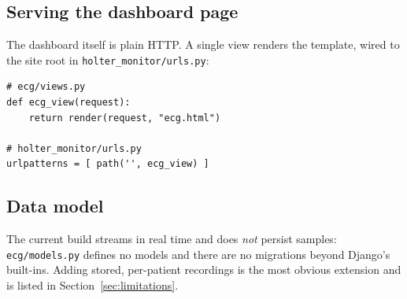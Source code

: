 \subsection{Serving the dashboard page}
The dashboard itself is plain HTTP. A single view renders the template, wired to
the site root in \texttt{holter\_monitor/urls.py}:
\begin{lstlisting}[style=py,numbers=none]
# ecg/views.py
def ecg_view(request):
    return render(request, "ecg.html")

# holter_monitor/urls.py
urlpatterns = [ path('', ecg_view) ]
\end{lstlisting}

\subsection{Data model}
The current build streams in real time and does \emph{not} persist samples:
\texttt{ecg/models.py} defines no models and there are no migrations beyond
Django's built-ins. Adding stored, per-patient recordings is the most obvious
extension and is listed in Section~\ref{sec:limitations}.
